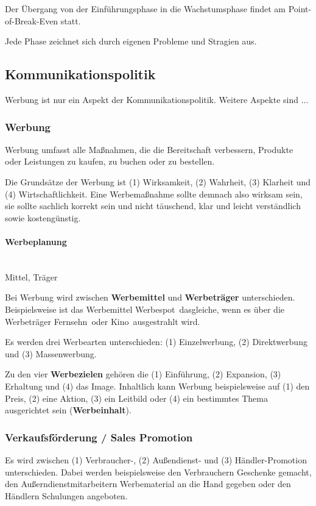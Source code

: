 Der Übergang von der Einführungsphase in die Wachstumsphase findet am Point-of-Break-Even statt.


Jede Phase zeichnet sich durch eigenen Probleme und Stragien aus. 

\subsection{Kommunikationspolitik}

Werbung ist nur ein Aspekt der Kommunikationspolitik. Weitere Aspekte sind ...

\subsubsection{Werbung}

Werbung umfasst alle Maßnahmen, die die Bereitschaft verbessern, Produkte oder Leistungen zu kaufen, zu buchen oder zu bestellen.

Die Grundsätze der Werbung ist (1) Wirksamkeit, (2) Wahrheit, (3) Klarheit und (4) Wirtschaftlichkeit. Eine Werbemaßnahme sollte demnach also wirksam sein, sie sollte sachlich korrekt sein und nicht täuschend, klar und leicht verständlich sowie kostengünstig.

\paragraph{Werbeplanung}~\\

Mittel, Träger

Bei Werbung wird zwischen {\bf Werbemittel} und {\bf Werbeträger} unterschieden. Beispielsweise ist das Werbemittel \ql Werbespot\qr\ dasgleiche, wenn es über die Werbeträger \ql Fernsehn\qr\ oder \ql Kino\qr\ ausgestrahlt wird.

Es werden drei Werbearten unterschieden: (1) Einzelwerbung, (2) Direktwerbung und (3) Massenwerbung. 

Zu den vier {\bf Werbezielen} gehören die (1) Einführung, (2) Expansion, (3) Erhaltung und (4) das Image. Inhaltlich kann Werbung beispielsweise auf (1) den Preis, (2) eine Aktion, (3) ein Leitbild oder (4) ein bestimmtes Thema ausgerichtet sein ({\bf Werbeinhalt}).

\subsubsection{Verkaufsförderung / Sales Promotion}

Es wird zwischen (1) Verbraucher-, (2) Außendienst- und (3) Händler-Promotion unterschieden. Dabei werden beispielsweise den Verbrauchern Geschenke gemacht, den Außerndienstmitarbeitern Werbematerial an die Hand gegeben oder den Händlern Schulungen angeboten.

